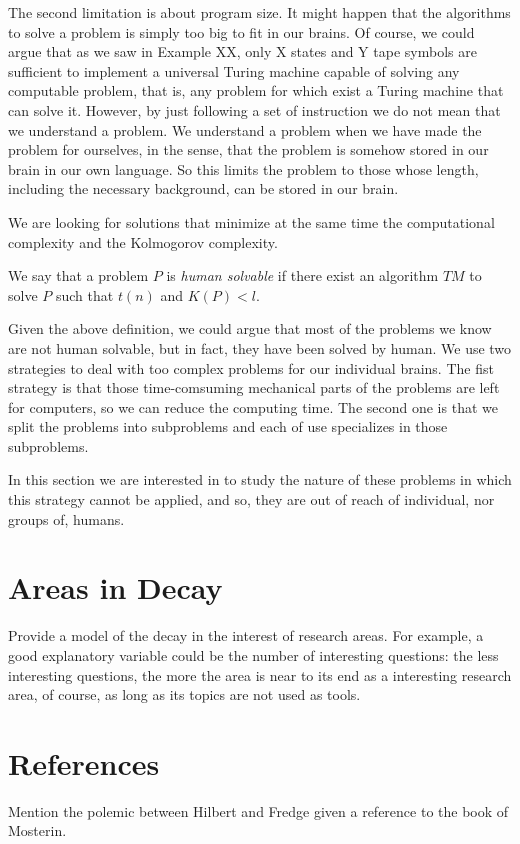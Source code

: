 The second limitation is about program size. It might happen that the algorithms to solve a problem is simply too big to fit in our brains. Of course, we could argue that {\color{red} as we saw in Example XX, only X states and Y tape symbols} are sufficient to implement a universal Turing machine capable of solving any computable problem, that is, any problem for which exist a Turing machine that can solve it. However, by just following a set of instruction we do not mean that we understand a problem. We understand a problem when we have made the problem for ourselves, in the sense, that the problem is somehow stored in our brain in our own language. So this limits the problem to those whose length, including the necessary background, can be stored in our brain.

We are looking for solutions that minimize at the same time the computational complexity and the Kolmogorov complexity.

\begin{definition}
We say that a problem $P$ is \emph{human solvable} if there exist an algorithm $TM$ to solve $P$ such that $t(n)$ and $K(P) < l$.
\end{definition}

Given the above definition, we could argue that most of the problems we know are not human solvable, but in fact, they have been solved by human. We use two strategies to deal with too complex problems for our individual brains. The fist strategy is that those time-comsuming mechanical parts of the problems are left for computers, so we can reduce the computing time. The second one is that we split the problems into subproblems and each of use specializes in those subproblems.

In this section we are interested in to study the nature of these problems in which this strategy cannot be applied, and so, they are out of reach of individual, nor groups of, humans.

%
%

\section{Areas in Decay}

{\color{red} Provide a model of the decay in the interest of research areas. For example, a good explanatory variable could be the number of interesting questions: the less interesting questions, the more the area is near to its end as a interesting research area, of course, as long as its topics are not used as tools.}

%
%

\section*{References}

{\color{red} Mention the polemic between Hilbert and Fredge given a reference to the book of Mosterin.}


